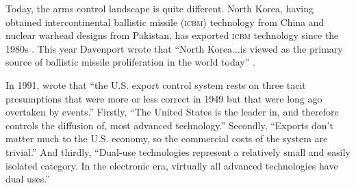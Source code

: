 \documentclass[12pt]{olfmemo}
\begin{document}
Today, the arms control landscape is quite different. North Korea, having obtained intercontinental ballistic missile (\textsc{icbm}) technology from China and nuclear warhead designs from Pakistan, has exported \textsc{icbm} technology since the 1980s \citep{Squassoni2006}. This year Davenport wrote that ``North Korea...is viewed as the primary source of ballistic missile proliferation in the world today'' \citep{Davenport2021}.

In 1991, \citet{Kuttner1991} wrote that ``the U.S. export control system rests on three tacit presumptions that were more or less correct in 1949 but that were long ago overtaken by events.'' Firstly, ``The United States is the leader in, and therefore controls the diffusion of, most advanced technology.'' Secondly, ``Exports don’t matter much to the U.S. economy, so the commercial costs of the system are trivial.'' And thirdly, ``Dual-use technologies represent a relatively small and easily isolated category. In the electronic era, virtually all advanced technologies have dual uses.''

\end{document}
